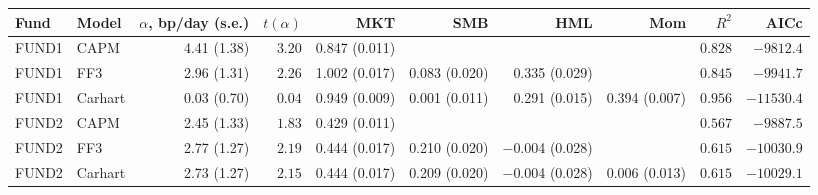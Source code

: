 \begin{tabular}{llrrrrrrrr}
\toprule
Fund & Model & $\alpha$, bp/day (s.e.) & $t(\alpha)$ & MKT & SMB & HML & Mom & $R^2$ & AICc \\
\midrule
FUND1 & CAPM & 4.41 (1.38) & $3.20$ & 0.847 (0.011) &  &  &  & $0.828$ & $-9812.4$ \\
FUND1 & FF3 & 2.96 (1.31) & $2.26$ & 1.002 (0.017) & 0.083 (0.020) & 0.335 (0.029) &  & $0.845$ & $-9941.7$ \\
FUND1 & Carhart & 0.03 (0.70) & $0.04$ & 0.949 (0.009) & 0.001 (0.011) & 0.291 (0.015) & 0.394 (0.007) & $0.956$ & $-11530.4$ \\
FUND2 & CAPM & 2.45 (1.33) & $1.83$ & 0.429 (0.011) &  &  &  & $0.567$ & $-9887.5$ \\
FUND2 & FF3 & 2.77 (1.27) & $2.19$ & 0.444 (0.017) & 0.210 (0.020) & $-$0.004 (0.028) &  & $0.615$ & $-10030.9$ \\
FUND2 & Carhart & 2.73 (1.27) & $2.15$ & 0.444 (0.017) & 0.209 (0.020) & $-$0.004 (0.028) & 0.006 (0.013) & $0.615$ & $-10029.1$ \\
\bottomrule
\end{tabular}
